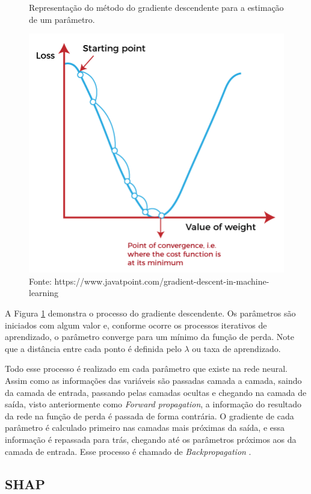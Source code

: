 \begin{figure}[H]
    \centering
    \caption{Representação do método do gradiente descendente para a estimação de um parâmetro.}
    \includegraphics[scale=0.7]{imagens/gradient_descent.png}
    \caption*{Fonte: https://www.javatpoint.com/gradient-descent-in-machine-learning}
    \label{fig:gradient_descent}
    
\end{figure}

A Figura \ref{fig:gradient_descent} demonstra o processo do gradiente descendente. Os parâmetros são iniciados com algum valor e, conforme ocorre os processos iterativos de aprendizado, o parâmetro converge para um mínimo da função de perda. Note que a distância entre cada ponto é definida pelo $\lambda$ ou taxa de aprendizado.


Todo esse processo é realizado em cada parâmetro que existe na rede neural. Assim como as informações das variáveis são passadas camada a camada, saindo da camada de entrada, passando pelas camadas ocultas e chegando na camada de saída, visto anteriormente como \textit{Forward propagation}, a informação do resultado da rede na função de perda é passada de forma contrária. O gradiente de cada parâmetro é calculado primeiro nas camadas mais próximas da saída, e essa informação é repassada para trás, chegando até os parâmetros próximos aos da camada de entrada. Esse processo é chamado de \textit{Backpropagation} \cite{werbos1974beyond}.


\subsection{SHAP}

